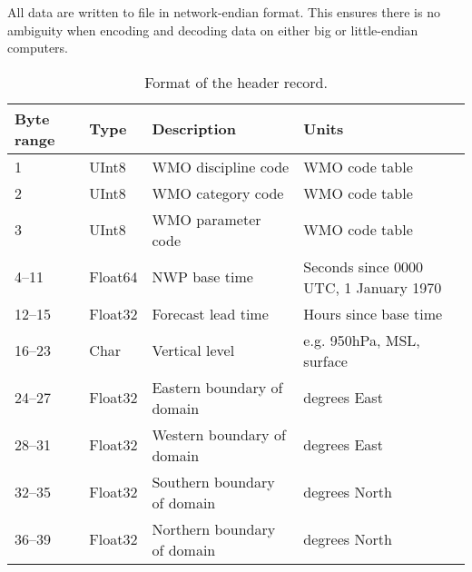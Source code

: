 \documentclass[12pt,a4paper]{article}
\begin{document}
All data are written to file in network-endian format. This ensures there is no
ambiguity when encoding and decoding data on either big or little-endian
computers. 

\begin{table*}
\centering
\begin{tabular}{llll} \hline
Byte range	& Type		& Description							& Units \\ \hline
1				& UInt8		& WMO discipline code	& WMO code table~\citep[Table 0.0]{wmo2014}	\\
2				& UInt8 		& WMO category	code		& WMO code table~\citep[Table 4.1]{wmo2014}	\\
3				& UInt8 		& WMO parameter code		& WMO code table~\citep[Table 4.2]{wmo2014}	\\
4--11			& Float64	& NWP base time 			& Seconds since 0000\,UTC, 1 January 1970	 	\\
12--15		& Float32	& Forecast lead time 				& Hours since base time										\\	
16--23		& Char		& Vertical level						& e.g. 950hPa, MSL, surface								\\
24--27		& Float32	& Eastern boundary of domain		& degrees East													\\
28--31		& Float32	& Western boundary of domain		& degrees East													\\
32--35		& Float32	& Southern boundary of domain		& degrees North												\\
36--39		& Float32	& Northern boundary of domain		& degrees North												\\ \hline
\end{tabular}
\caption{\label{tab:header_record}Format of the header record.}
\end{table*}
\end{document}

